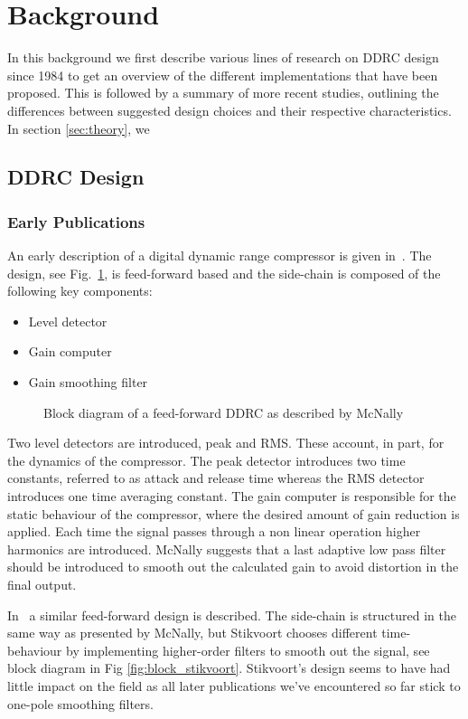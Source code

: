 \documentclass[../main2.tex]{subfiles}
\providecommand{\rootdir}{..}
\begin{document}
\section{Background}
In this background we first describe various lines of research on DDRC design since 1984 to get an overview of the different implementations that have been proposed. This is followed by a summary of more recent studies, outlining the differences between suggested design choices and their respective characteristics. In section \ref{sec:theory}, we 

\FloatBarrier
\subsection{DDRC Design}
\subsubsection{Early Publications}
An early description of a digital dynamic range compressor is given in~\cite{mcnally1984dynamic}. The design, see Fig.~\ref{fig:block_mcnally}, is feed-forward based and the side-chain is composed of the following key components:

\begin{itemize}
\item{Level detector}
\item{Gain computer}
\item{Gain smoothing filter}
\end{itemize}

\begin{figure}

\caption{Block diagram of a feed-forward DDRC as described by McNally}
\label{fig:block_mcnally}
\end{figure}

Two level detectors are introduced, peak and RMS. These account, in part, for the dynamics of the compressor. The peak detector introduces two time constants, referred to as attack and release time whereas the RMS detector introduces one time averaging constant. The gain computer is responsible for the static behaviour of the compressor, where the desired amount of gain reduction is applied. Each time the signal passes through a non linear operation higher harmonics are introduced. McNally suggests that a last adaptive low pass filter should be introduced to smooth out the calculated gain to avoid distortion in the final output.

In~\cite{stikvoort1986digital} a similar feed-forward design is described. The side-chain is structured in the same way as presented by McNally, but Stikvoort chooses different time-behaviour by implementing higher-order filters to smooth out the signal, see block diagram in Fig \ref{fig:block_stikvoort}. Stikvoort's design seems to have had little impact on the field as all later publications we've encountered so far stick to one-pole smoothing filters.
\end{document}
